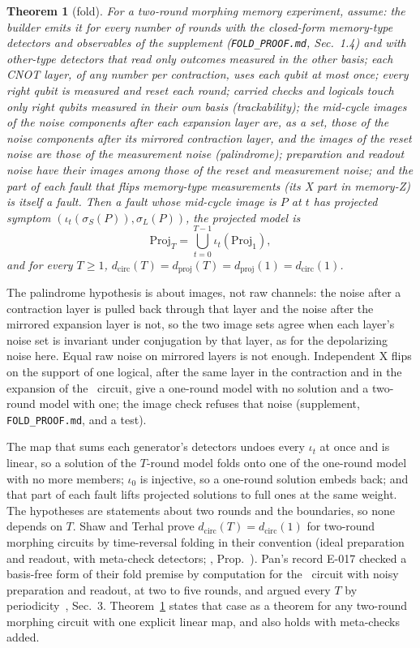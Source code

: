 \documentclass[aps,pra,twocolumn,superscriptaddress,nofootinbib,longbibliography,floatfix]{revtex4-2}
\newtheorem{theorem}{Theorem}
\newcommand{\dc}{d_{\mathrm{circ}}}
\newcommand{\dproj}{d_{\mathrm{proj}}}
\begin{document}
\begin{theorem}[fold]
\label{thm:fold}
For a two-round morphing memory experiment, assume: the builder emits it for every number of rounds with the closed-form memory-type detectors and observables of the supplement (\texttt{FOLD\_PROOF.md}, Sec.~1.4) and with other-type detectors that read only outcomes measured in the other basis; each CNOT layer, of any number per contraction, uses each qubit at most once; every right qubit is measured and reset each round; carried checks and logicals touch only right qubits measured in their own basis (trackability); the mid-cycle images of the noise components after each expansion layer are, as a set, those of the noise components after its mirrored contraction layer, and the images of the reset noise are those of the measurement noise (palindrome); preparation and readout noise have their images among those of the reset and measurement noise; and the part of each fault that flips memory-type measurements (its X part in memory-Z) is itself a fault. Then a fault whose mid-cycle image is $P$ at $t$ has projected symptom $(\iota_t(\sigma_S(P)),\sigma_L(P))$, the projected model is
\[
\mathrm{Proj}_T=\bigcup_{t=0}^{T-1}\iota_t(\mathrm{Proj}_1),
\]
and for every $T\ge1$, $\dc(T)=\dproj(T)=\dproj(1)=\dc(1)$.
\end{theorem}

The palindrome hypothesis is about images, not raw channels: the noise after a contraction layer is pulled back through that layer and the noise after the mirrored expansion layer is not, so the two image sets agree when each layer's noise set is invariant under conjugation by that layer, as for the depolarizing noise here. Equal raw noise on mirrored layers is not enough. Independent X flips on the support of one logical, after the same layer in the contraction and in the expansion of the \SmallCode\ circuit, give a one-round model with no solution and a two-round model with one; the image check refuses that noise (supplement, \texttt{FOLD\_PROOF.md}, and a test).

The map that sums each generator's detectors undoes every $\iota_t$ at once and is linear, so a solution of the $T$-round model folds onto one of the one-round model with no more members; $\iota_0$ is injective, so a one-round solution embeds back; and that part of each fault lifts projected solutions to full ones at the same weight. The hypotheses are statements about two rounds and the boundaries, so none depends on $T$. Shaw and Terhal prove $\dc(T)=\dc(1)$ for two-round morphing circuits by time-reversal folding in their convention (ideal preparation and readout, with meta-check detectors; \cite{shaw2026optimising}, Prop.~\STbProp). Pan's record E-017 checked a basis-free form of their fold premise by computation for the \GrossCode\ circuit with noisy preparation and readout, at two to five rounds, and argued every $T$ by periodicity~\cite{pan2026e017}, Sec.~3. Theorem~\ref{thm:fold} states that case as a theorem for any two-round morphing circuit with one explicit linear map, and also holds with meta-checks added.
\end{document}
